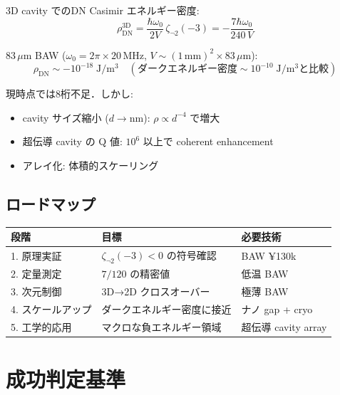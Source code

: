 \documentclass[11pt,a4paper]{article}
\begin{document}
3D cavity でのDN Casimir エネルギー密度:
\begin{equation}
  \rho_{\mathrm{DN}}^{\mathrm{3D}} = \frac{\hbar\omega_0}{2V}\,\zeta_{\neg 2}(-3)
  = -\frac{7\hbar\omega_0}{240\,V}
\end{equation}

83\,$\mu$m BAW ($\omega_0 = 2\pi \times 20\,\mathrm{MHz}$, $V \sim (1\,\mathrm{mm})^2 \times 83\,\mu\mathrm{m}$):
\begin{equation}
  \rho_{\mathrm{DN}} \sim -10^{-18}\;\mathrm{J/m^3}
  \quad (\text{ダークエネルギー密度} \sim 10^{-10}\;\mathrm{J/m^3} \text{と比較})
\end{equation}

現時点では8桁不足．しかし:
\begin{itemize}
\item cavity サイズ縮小 ($d \to \mathrm{nm}$): $\rho \propto d^{-4}$ で増大
\item 超伝導 cavity の Q 値: $10^6$ 以上で coherent enhancement
\item アレイ化: 体積的スケーリング
\end{itemize}

\subsection{ロードマップ}

\begin{center}
\begin{tabular}{lll}
\toprule
段階 & 目標 & 必要技術 \\
\midrule
1. 原理実証 & $\zeta_{\neg 2}(-3) < 0$ の符号確認 & BAW ¥130k \\
2. 定量測定 & $7/120$ の精密値 & 低温 BAW \\
3. 次元制御 & 3D→2D クロスオーバー & 極薄 BAW \\
4. スケールアップ & ダークエネルギー密度に接近 & ナノ gap + cryo \\
5. 工学的応用 & マクロな負エネルギー領域 & 超伝導 cavity array \\
\bottomrule
\end{tabular}
\end{center}


\section{成功判定基準}
\end{document}
